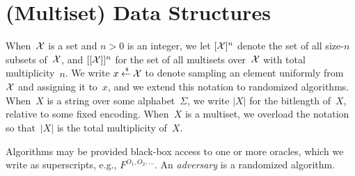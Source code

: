 \newcommand{\qry}{\mathsf{qry}}
\section{(Multiset) Data Structures}

 When~${\cal X}$ is a set and $n>0$ is an
integer, we let $[{\cal X}]^n$ denote the set of all size-$n$ subsets
of~${\cal X}$, and $[[{\cal X}]]^n$ for the set of all multisets
over~${\cal X}$ with total multiplicity~$n$.   We write $x {\:\stackrel{{\scriptscriptstyle \hspace{0.2em}\$}} {\leftarrow}\:} {\cal X}$ to denote
sampling an element uniformly from~${\cal X}$ and assigning it to~$x$,
and we extend this notation to randomized algorithms. When~$X$ is a
string over some alphabet~$\Sigma$, we write $|X|$ for the bitlength
of~$X$, relative to some fixed encoding.  When~$X$ is a multiset, we
overload the notation so that~$|X|$ is the total multiplicity
of~$X$.

Algorithms may be provided black-box access to one or more oracles,
which we write as superscripts, e.g., $F^{O_1,O_2,\ldots}$.  An \emph{adversary} is a randomized algorithm.

